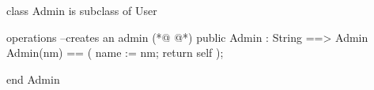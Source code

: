 \begin{vdmpp}[breaklines=true]
class Admin is subclass of User

operations
    --creates an admin
(*@
\label{Admin:5}
@*)
    public Admin : String ==> Admin
        Admin(nm) == (
            name := nm;
            return self
        );

end Admin
\end{vdmpp}
